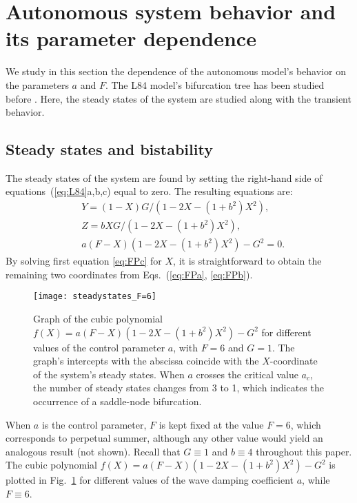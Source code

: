 \documentclass[%
 aip, cha,
 amsmath,amssymb,
 reprint,%
author-year,%
]{revtex4-1}
\newcommand{\0}{\mathbf 0}
\begin{document}
\section{Autonomous system behavior and its parameter dependence}
\label{sec:system_behaviour}
We study in this section the dependence of the autonomous model's behavior on the parameters $a$ and $F$. The L84 model's bifurcation tree has been studied before \citep{shilnikov, Broer, vanveen2003}. Here, the steady states of the system are studied along with the transient behavior.

\subsection{Steady states and bistability} \label{ssec:2_fold}
The steady states of the system are found by setting the right-hand side of equations~(\ref{eq:L84}a,b,c) %
equal to zero. The resulting equations are:
\begin{subequations} \label{eq:FPs}
	\begin{align}
& Y = (1-X)G/(1-2X-(1+b^2)X^2), \label{eq:FPa} \\
& Z = bXG/(1-2X-(1+b^2)X^2), \label{eq:FPb} \\
& a(F-X)(1-2X-(1+b^2)X^2)-G^2=0. \label{eq:FPc} 
\end{align}
\end{subequations}
By solving first equation \eqref{eq:FPc} for $X$, it is straightforward to obtain the remaining two coordinates from Eqs.~(\ref{eq:FPa}, \ref{eq:FPb}). 
\begin{figure}
    \texttt{[image: steadystates\_F=6]}
    \caption{Graph of the cubic polynomial $f(X) = a(F-X)(1-2X-(1+b^2)X^2)-G^2$ for different values of the control parameter $a$, with $F = 6$ and $G = 1$. The graph's intercepts with the abscissa coincide with the $X$-coordinate of the system's steady states. When $a$ crosses the critical value $a_c$, the number of steady states changes from 3 to 1, which indicates the occurrence of a saddle-node bifurcation. }
    \label{fig:polynomial} 
\end{figure}
When $a$ is the control parameter, $F$ is kept fixed at the value $F=6$, which corresponds to perpetual summer, although any other value would yield an analogous result (not shown). 
Recall that $G \equiv 1$ and $b\equiv 4$ throughout this paper. \\
The cubic polynomial $f(X)=a(F-X)(1-2X-(1+b^2)X^2)-G^2$ is plotted in Fig.~\ref{fig:polynomial} for different values of the wave damping coefficient $a$, while $F \equiv 6$. 
\end{document}
